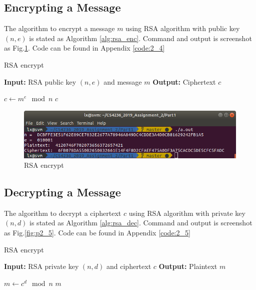 \subsection{Encrypting a Message}

The algorithm to encrypt a message $m$ using RSA algorithm with public key $(n, e) $ is stated as Algorithm \ref{alg:rsa_enc}.
Command and output is screenshot as Fig.\ref{fig:p2_4}.
Code can be found in Appendix \ref{code:2_4}

\begin{algorithm}
\caption{RSA encrypt}
\label{alg:rsa_enc}
\begin{algorithmic}
\STATE \textbf{Input:} RSA public key $(n, e)$ and message $m$
\STATE \textbf{Output:} Ciphertext $c$

\STATE $ c \gets m^e \mod{n} $
\RETURN $ c $
\end{algorithmic}
\end{algorithm}

\begin{figure}[ht]
\centering
\includegraphics[width=\columnwidth]{pictures/p2_4.png}
\caption{
    RSA encrypt
}
\label{fig:p2_4}
\end{figure}

\subsection{Decrypting a Message}

The algorithm to decrypt a ciphertext $c$ using RSA algorithm with private key $(n, d) $ is stated as Algorithm \ref{alg:rsa_dec}.
Command and output is screenshot as Fig.\ref{fig:p2_5}.
Code can be found in Appendix \ref{code:2_5}

\begin{algorithm}
\caption{RSA encrypt}
\label{alg:rsa_dec}
\begin{algorithmic}
\STATE \textbf{Input:} RSA private key $(n, d)$ and ciphertext $c$
\STATE \textbf{Output:} Plaintext $m$

\STATE $ m \gets c^d \mod{n} $
\RETURN $ m $
\end{algorithmic}
\end{algorithm}

